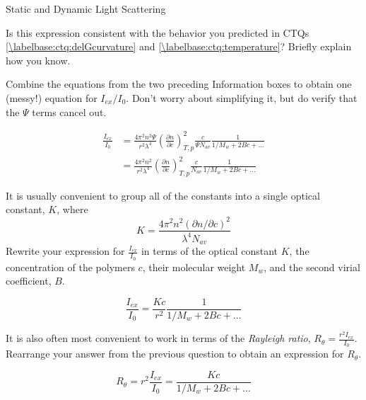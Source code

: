 \begin{activity}{Static and Dynamic Light Scattering}
\begin{ctqs}
	\question Is this expression consistent with the behavior you predicted in CTQs \ref{\labelbase:ctq:delGcurvature} and \ref{\labelbase:ctq:temperature}?  Briefly explain how you know.
	
		\begin{solution}[1in]{}
		\end{solution}

	\question Combine the equations from the two preceding Information boxes to obtain one (messy!) equation for $I_{ex}/I_0$.   Don't worry about simplifying it, but do verify that the $\Psi$ terms cancel out.
	
		\begin{solution}[1.5in]{}
			\begin{align*}
				\frac{I_{ex}}{I_0} &= \frac{4 \pi^2 n^2 \Psi}{r^2 \lambda^4}\left(\frac{\partial n}{\partial c}\right)^2_{T,p} \frac{c}{\Psi N_{av}} \frac{1}{1/M_w + 2Bc + \dots} \\
				&= \frac{4 \pi^2 n^2}{r^2 \lambda^4}\left(\frac{\partial n}{\partial c}\right)^2_{T,p} \frac{c}{ N_{av}} \frac{1}{1/M_w + 2Bc + \dots}
			\end{align*}
		\end{solution}
		
	\question It is usually convenient to group all of the constants into a single optical constant, $K$, where
		\begin{equation*}
			K = \frac{4\pi^2 n^2 (\partial n / \partial c)^2}{\lambda^4 N_{av}}
		\end{equation*}
		Rewrite your expression for $\frac{I_{ex}}{I_0}$ in terms of the optical constant $K$, the concentration of the polymers $c$, their molecular weight $M_w$, and the second virial coefficient, $B$.
		
		\begin{solution}[1in]{}
			\begin{equation*}
				\frac{I_{ex}}{I_0} = \frac{Kc}{r^2} \frac{1}{1/M_w + 2Bc + \dots}
			\end{equation*}
		\end{solution}
	
	\question It is also often most convenient to work in terms of the \emph{Rayleigh ratio}, $R_\theta = \frac{r^2 I_{ex}}{I_0}$.  Rearrange your answer from the previous question to obtain an expression for $R_\theta$.
		
		\begin{solution}[1in]{}
			\begin{equation*}
				R_\theta = r^2 \frac{I_{ex}}{I_0} = \frac{Kc}{1/M_w + 2Bc + \dots}
			\end{equation*}
		\end{solution}
	

\end{ctqs}
\end{activity}
